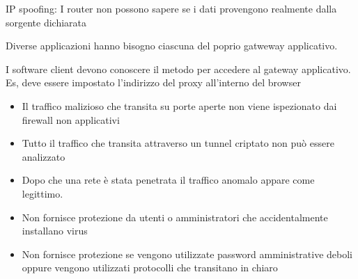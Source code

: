  IP spoofing: I router non possono sapere se i dati provengono realmente dalla sorgente dichiarata

Diverse applicazioni hanno bisogno ciascuna del poprio gatweway applicativo.

I software client devono conoscere il metodo per accedere al gateway applicativo.
Es, deve essere impostato l’indirizzo del proxy all’interno del browser

\begin{itemize}
    \item Il traffico malizioso che transita su porte aperte non viene ispezionato dai firewall non applicativi

     \item Tutto il traffico che transita attraverso un tunnel criptato non può essere analizzato

    \item Dopo che una rete è stata penetrata il traffico anomalo appare come legittimo.

     \item Non fornisce protezione da utenti o amministratori che accidentalmente installano virus

   \item Non fornisce protezione se vengono utilizzate password amministrative deboli oppure vengono utilizzati protocolli che transitano in chiaro
   
   
\end{itemize}


